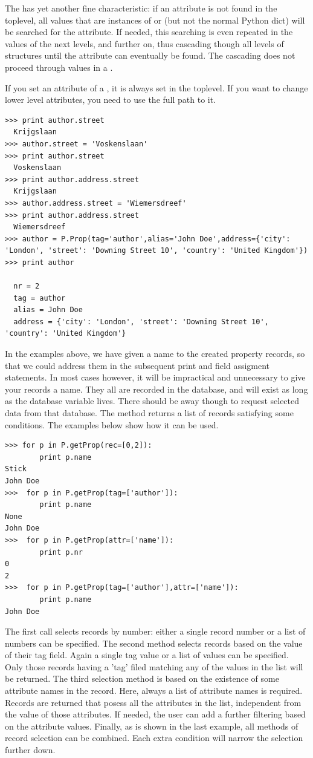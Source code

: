 The  has yet another fine characteristic: if an attribute is not found in the toplevel, all values that are instances of  or  (but not the normal Python dict) will be searched for the attribute. If needed, this searching is even repeated in the values of the next levels, and further on, thus cascading though all levels of  structures until the attribute can eventually be found. The cascading does not proceed through values in a .

If you set an attribute of a , it is always set in the toplevel. If you want to change lower level attributes, you need to use the full path to it.
\begin{verbatim}
>>> print author.street
  Krijgslaan
>>> author.street = 'Voskenslaan'
>>> print author.street
  Voskenslaan
>>> print author.address.street
  Krijgslaan
>>> author.address.street = 'Wiemersdreef'
>>> print author.address.street
  Wiemersdreef
>>> author = P.Prop(tag='author',alias='John Doe',address={'city': 'London', 'street': 'Downing Street 10', 'country': 'United Kingdom'})
>>> print author

  nr = 2
  tag = author
  alias = John Doe
  address = {'city': 'London', 'street': 'Downing Street 10', 'country': 'United Kingdom'} 
\end{verbatim}

In the examples above, we have given a name to the created property records, so that we could address them in the subsequent print and field assigment statements. In most cases however, it will be impractical and unnecessary to give your records a name. They all are recorded in the  database, and will exist as long as the database variable lives. There should be away though to request selected data from that database. The  method returns a list of records satisfying some conditions. The examples below show how it can be used.

\begin{verbatim}
>>> for p in P.getProp(rec=[0,2]):
        print p.name
Stick
John Doe
>>>  for p in P.getProp(tag=['author']):
        print p.name
None
John Doe
>>>  for p in P.getProp(attr=['name']):
        print p.nr
0
2
>>>  for p in P.getProp(tag=['author'],attr=['name']):
        print p.name
John Doe
\end{verbatim}
The first call selects records by number: either a single record number or a list of numbers can be specified. The second method selects records based on the value of their tag field. Again a single tag value or a list of values can be specified. Only those records having a 'tag' filed matching any of the values in the list will be returned. The third selection method is based on the existence of some attribute names in the record. Here, always a list of attribute names is required. Records are returned that posess all the attributes in the list, independent from the value of those attributes. If needed, the user can add a further filtering based on the attribute values. Finally, as is shown in the last example, all methods of record selection can be combined. Each extra condition will narrow the selection further down.


